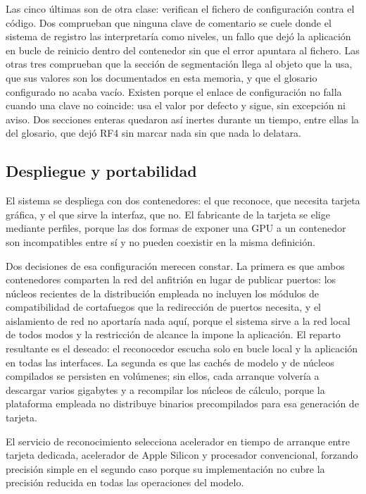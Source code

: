 Las cinco últimas son de otra clase: verifican el fichero de configuración contra el
código. Dos comprueban que ninguna clave de comentario se cuele donde el sistema de
registro las interpretaría como niveles, un fallo que dejó la aplicación en bucle de
reinicio dentro del contenedor sin que el error apuntara al fichero. Las otras tres
comprueban que la sección de segmentación llega al objeto que la usa, que sus valores son
los documentados en esta memoria, y que el glosario configurado no acaba vacío. Existen
porque el enlace de configuración no falla cuando una clave no coincide: usa el valor por
defecto y sigue, sin excepción ni aviso. Dos secciones enteras quedaron así inertes durante
un tiempo, entre ellas la del glosario, que dejó RF4 sin marcar nada sin que nada lo
delatara.

\subsection{Despliegue y portabilidad}

El sistema se despliega con dos contenedores: el que reconoce, que necesita tarjeta gráfica,
y el que sirve la interfaz, que no. El fabricante de la tarjeta se elige mediante perfiles,
porque las dos formas de exponer una GPU a un contenedor son incompatibles entre sí y no
pueden coexistir en la misma definición.

Dos decisiones de esa configuración merecen constar. La primera es que ambos contenedores
comparten la red del anfitrión en lugar de publicar puertos: los núcleos recientes de la
distribución empleada no incluyen los módulos de compatibilidad de cortafuegos que la
redirección de puertos necesita, y el aislamiento de red no aportaría nada aquí, porque el
sistema sirve a la red local de todos modos y la restricción de alcance la impone la
aplicación. El reparto resultante es el deseado: el reconocedor escucha solo en bucle local
y la aplicación en todas las interfaces. La segunda es que las cachés de modelo y de núcleos
compilados se persisten en volúmenes; sin ellos, cada arranque volvería a descargar varios
gigabytes y a recompilar los núcleos de cálculo, porque la plataforma empleada no distribuye
binarios precompilados para esa generación de tarjeta.

El servicio de reconocimiento selecciona acelerador en tiempo de arranque entre tarjeta
dedicada, acelerador de Apple Silicon y procesador convencional, forzando precisión simple
en el segundo caso porque su implementación no cubre la precisión reducida en todas las
operaciones del modelo.

